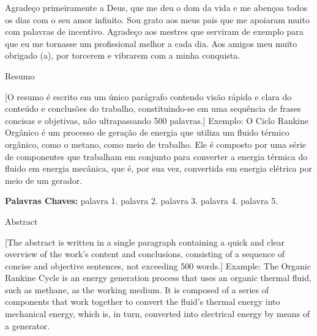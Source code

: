 \documentclass[
  12pt,
  oneside,
  a4paper,
  english,
  brazil]{abntex2}
\begin{document}
\vspace{2cm}

\newpage{}

\begin{agradecimentos}

Agradeço primeiramente a Deus, que me deu o dom da vida e me abençoa todos os dias com o seu amor infinito. Sou grato aos meus pais que me apoiaram muito com palavras de incentivo. Agradeço aos mestres que serviram de exemplo para que eu me tornasse um profissional melhor a cada dia. Aos amigos meu muito obrigado (a), por torcerem e vibrarem com a minha conquista.

\end{agradecimentos}

\begin{center}
Resumo
\end{center}

{[}O resumo é escrito em um único parágrafo contendo visão rápida e
clara do conteúdo e conclusões do trabalho, constituindo-se em uma
sequência de frases concisas e objetivas, não ultrapassando 500
palavras.{]} Exemplo: O Ciclo Rankine Orgânico é um processo de geração
de energia que utiliza um fluido térmico orgânico, como o metano, como
meio de trabalho. Ele é composto por uma série de componentes que
trabalham em conjunto para converter a energia térmica do fluido em
energia mecânica, que é, por sua vez, convertida em energia elétrica por
meio de um gerador.

\vspace{1cm}

\textbf{Palavras Chaves: } palavra 1. palavra 2. palavra 3. palavra 4.
palavra 5.

\newpage{}

\begin{center}
Abstract
\end{center}

{[}The abstract is written in a single paragraph containing a quick and
clear overview of the work's content and conclusions, consisting of a
sequence of concise and objective sentences, not exceeding 500 words.{]}
Example: The Organic Rankine Cycle is an energy generation process that
uses an organic thermal fluid, such as methane, as the working medium.
It is composed of a series of components that work together to convert
the fluid's thermal energy into mechanical energy, which is, in turn,
converted into electrical energy by means of a generator.

\vspace{1cm}
\end{document}
